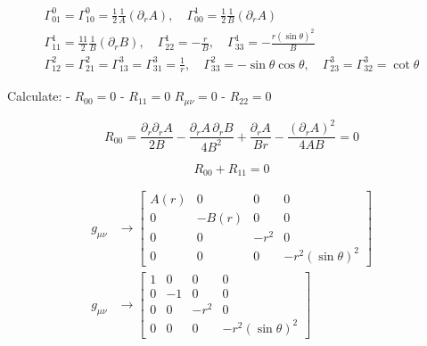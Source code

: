 \begin{equation}
    \begin{gathered}
        \Gamma_{01}^0=\Gamma_{10}^0=\frac{1}{2} \frac{1}{A}\left(\partial_r A\right), \quad \Gamma_{00}^1=\frac{1}{2} \frac{1}{B}\left(\partial_r A\right) \\
        \Gamma_{11}^1=\frac{11}{2} \frac{1}{B}\left(\partial_r B\right), \quad \Gamma_{22}^1=-\frac{r}{B}, \quad \Gamma_{33}^1=-\frac{r(\sin \theta)^2}{B} \\
        \Gamma_{12}^2=\Gamma_{21}^2=\Gamma_{13}^3=\Gamma_{31}^3=\frac{1}{r}, \quad \Gamma_{33}^2=-\sin \theta \cos \theta, \quad \Gamma_{23}^3=\Gamma_{32}^3=\cot \theta
    \end{gathered}
\end{equation}

Calculate:
- $R_{00}=0$
- $R_{11}=0$
$R_{\mu \nu}=0$
- $R_{22}=0$

\begin{equation}
    R_{00}=\frac{\partial_r \partial_r A}{2 B}
    -\frac{\partial_r A \,\partial_r B}{4 B^2}
    +\frac{\partial_r A}{B r}
    -\frac{\left(\partial_r A\right)^2}{4 A B}=0
\end{equation}

\begin{equation}
    R_{00}+R_{11}=0
\end{equation}

\begin{equation}
    \begin{aligned}
        g_{\mu \nu} & \rightarrow\left[\begin{array}{cccc}
                                               A(r) & 0     & 0    & 0                   \\
                                               0    & -B(r) & 0    & 0                   \\
                                               0    & 0     & -r^2 & 0                   \\
                                               0    & 0     & 0    & -r^2(\sin \theta)^2
                                           \end{array}\right] \\
        g_{\mu \nu} & \rightarrow\left[\begin{array}{cccc}
                                               1 & 0  & 0    & 0                   \\
                                               0 & -1 & 0    & 0                   \\
                                               0 & 0  & -r^2 & 0                   \\
                                               0 & 0  & 0    & -r^2(\sin \theta)^2
                                           \end{array}\right]
    \end{aligned}
\end{equation}

